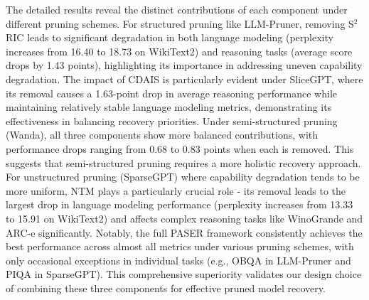 The detailed results reveal the distinct contributions of each component under different pruning schemes. For structured pruning like LLM-Pruner, removing S$^2$RIC leads to significant degradation in both language modeling (perplexity increases from 16.40 to 18.73 on WikiText2) and reasoning tasks (average score drops by 1.43 points), highlighting its importance in addressing uneven capability degradation. The impact of CDAIS is particularly evident under SliceGPT, where its removal causes a 1.63-point drop in average reasoning performance while maintaining relatively stable language modeling metrics, demonstrating its effectiveness in balancing recovery priorities. Under semi-structured pruning (Wanda), all three components show more balanced contributions, with performance drops ranging from 0.68 to 0.83 points when each is removed. This suggests that semi-structured pruning requires a more holistic recovery approach. For unstructured pruning (SparseGPT) where capability degradation tends to be more uniform, NTM plays a particularly crucial role - its removal leads to the largest drop in language modeling performance (perplexity increases from 13.33 to 15.91 on WikiText2) and affects complex reasoning tasks like WinoGrande and ARC-e significantly. Notably, the full PASER framework consistently achieves the best performance across almost all metrics under various pruning schemes, with only occasional exceptions in individual tasks (e.g., OBQA in LLM-Pruner and PIQA in SparseGPT). This comprehensive superiority validates our design choice of combining these three components for effective pruned model recovery.
\vspace{-1mm}


